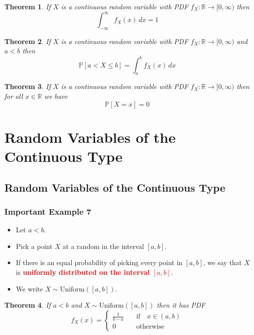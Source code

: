 \documentclass{article}
\newcommand{\PP}{\mathbb{P}}
\newcommand{\R}{\mathbb{R}}
\newcommand{\bfred}[1]{\textcolor{red}{\textbf{#1}}}
\theoremstyle{plain}
\newtheorem{thm}{Theorem}[section]
\theoremstyle{definition}
\theoremstyle{remark}
\begin{document}
\begin{thm}
    If $X$ is a continuous random variable with PDF $f_X:\R\rightarrow[0,\infty)$ then \[\int_{-\infty}^\infty f_X(x)\,dx = 1\]
\end{thm}

\begin{thm}
    If $X$ is a continuous random variable with PDF $f_X:\R\rightarrow[0,\infty)$ and $a<b$ then \[\PP[a < X \leq b] = \int_{a}^{b}f_X(x)\,dx\]
\end{thm}

\begin{thm}
    If $X$ is a continuous random variable with PDF $f_X:\R\rightarrow[0,\infty)$ then for all $x\in\R$ we have \[\PP[X=x]=0\]
\end{thm}

\section{Random Variables of the Continuous Type}

\subsection{Random Variables of the Continuous Type}

\subsubsection*{Important Example 7}

\begin{tcolorbox}[title = Uniform Distribution, colback = SkyBlue!5!white,colframe = SkyBlue!75!black]
    \begin{itemize}
        \item Let $a<b$.
        \item Pick a point $X$ at a random in the interval $[a,b]$.
        \item If there is an equal probability of picking every point in $[a,b]$, we say that $X$ is \bfred{uniformly distributed on the interval $[a,b]$}.
        \item We write $X \sim \text{Uniform}([a,b])$.
    \end{itemize}
\end{tcolorbox}

\begin{thm}
    If $a<b$ and $X \sim \text{Uniform}([a,b])$ then it has PDF \[f_X(x) =
    \begin{cases}
        \frac{1}{b-a} \quad &\text{if} \quad x\in(a,b) \\
        0 \quad &\text{otherwise}
    \end{cases}\]
\end{thm}
\end{document}
